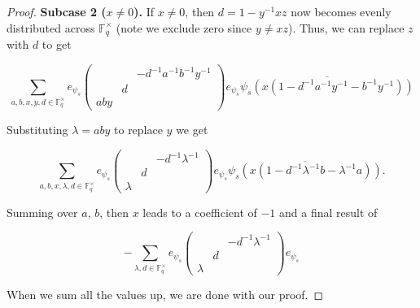 \documentclass[12pt,reqno]{amsart}
\theoremstyle{definition}
\theoremstyle{remark}
\numberwithin{equation}{section}
\begin{document}
\begin{proof}
    \textbf{Subcase 2 ($x \ne 0$).} If $x \ne 0$, then $d = 1-y^{-1}xz$ now becomes evenly distributed across $\mathbb{F}_q^\times$ (note we exclude zero since $y \ne xz$). Thus, we can replace $z$ with $d$ to get

    \begin{equation*}
        \sum_{a, b, x, y, d \in \mathbb{F}_q^\times} e_{\psi_s} \begin{pmatrix}
            & & -d^{-1}a^{-1}b^{-1}y^{-1}\\
            & d &\\
            aby & &
        \end{pmatrix} e_{\psi_s} \overline{\psi_s(x(1-d^{-1}a^{-1}y^{-1}-b^{-1}y^{-1}))}
    \end{equation*}

    Substituting $\lambda = aby$  to replace $y$ we get

    \begin{equation*}
        \sum_{a, b, x, \lambda, d \in \mathbb{F}_q^\times} e_{\psi_s} \begin{pmatrix}
            & & -d^{-1}\lambda^{-1}\\
            & d &\\
            \lambda & &
        \end{pmatrix} e_{\psi_s} \overline{\psi_s(x(1-d^{-1}\lambda^{-1}b-\lambda^{-1}a))}.
    \end{equation*}

    Summing over $a$, $b$, then $x$ leads to a coefficient of $-1$ and a final result of 

    \begin{equation*}
        -\sum_{\lambda, d \in \mathbb{F}_q^\times} e_{\psi_s} \begin{pmatrix}
            & & -d^{-1}\lambda^{-1}\\
            & d &\\
            \lambda & &
        \end{pmatrix} e_{\psi_s}
    \end{equation*}
    
    When we sum all the values up, we are done with our proof.
\end{proof}
\end{document}
